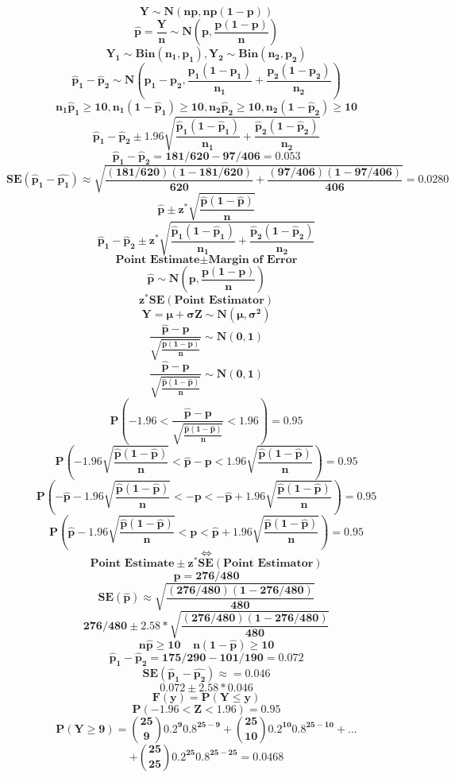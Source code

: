 \documentclass[12pt,portrait,semhelv,semrot]{article}
\begin{document}
{{$$\boldsymbol{Y\sim N(np, np(1-p))}$$
$$\boldsymbol{\hat{p} = \frac{Y}{n} \sim N\left(p, \frac{p(1-p)}{n}\right)}$$
$$\boldsymbol{Y_1\sim Bin(n_1,p_1), Y_2 \sim Bin(n_2, p_2)}$$
$$\boldsymbol{\hat{p}_1-\hat{p}_2 \sim N\left(p_1-p_2, \frac{p_1(1-p_1)}{n_1}+\frac{p_2(1-p_2)}{n_2}\right)}$$
$$\boldsymbol{n_1\hat{p}_1\geq 10, n_1(1-\hat{p}_1)\geq 10, n_2\hat{p}_2\geq 10, n_2(1-\hat{p}_2)\geq 10}$$
$$\boldsymbol{\hat{p}_1-\hat{p}_2 \pm 1.96\sqrt{\frac{\hat{p}_1(1-\hat{p}_1)}{n_1}+\frac{\hat{p}_2(1-\hat{p}_2)}{n_2}}}$$
$$\boldsymbol{\hat{p}_1 - \hat{p}_2 = 181/620 - 97/406 = 0.053}$$
$$\boldsymbol{SE(\hat{p}_1-\hat{p_1}) \approx \sqrt{\frac{(181/620)(1-181/620)}{620}+\frac{(97/406)(1-97/406)}{406}} = 0.0280}$$
$$\boldsymbol{\hat{p}\pm z^{*} \sqrt{\frac{\hat{p}(1-\hat{p})}{n}}}$$
$$\boldsymbol{\hat{p}_1-\hat{p}_2 \pm z^{*}\sqrt{\frac{\hat{p}_1(1-\hat{p}_1)}{n_1}+\frac{\hat{p}_2(1-\hat{p}_2)}{n_2}}}$$
$$\boldsymbol{\mbox{Point Estimate}\pm \mbox{Margin of Error}}$$
$$\boldsymbol{\hat{p}\sim N\left(p, \frac{p(1-p)}{n}\right)}$$
$$\boldsymbol{z^{*}SE(\mbox{Point Estimator})}$$
$$\boldsymbol{Y = \mu + \sigma Z \sim N(\mu, \sigma^2)}$$
$$\boldsymbol{\frac{\hat{p} - p}{\sqrt{\frac{p(1-p)}{n}}} \sim N(0, 1)}$$
$$\boldsymbol{\frac{\hat{p} - p}{\sqrt{\frac{\hat{p}(1-\hat{p})}{n}}} \sim N(0, 1)}$$
$$\boldsymbol{P\left(-1.96 < \frac{\hat{p} - p}{\sqrt{\frac{\hat{p}(1-\hat{p})}{n}}} < 1.96\right) = 0.95}$$
$$\boldsymbol{P\left(-1.96\sqrt{\frac{\hat{p}(1-\hat{p})}{n}} < \hat{p} - p < 1.96\sqrt{\frac{\hat{p}(1-\hat{p})}{n}}\right) = 0.95}$$
$$\boldsymbol{P\left(-\hat{p}-1.96\sqrt{\frac{\hat{p}(1-\hat{p})}{n}} < - p < -\hat{p} + 1.96\sqrt{\frac{\hat{p}(1-\hat{p})}{n}}\right) = 0.95}$$
$$\boldsymbol{P\left(\hat{p}-1.96\sqrt{\frac{\hat{p}(1-\hat{p})}{n}} < p < \hat{p} + 1.96\sqrt{\frac{\hat{p}(1-\hat{p})}{n}}\right) = 0.95}$$
$$\boldsymbol{\iff}$$
$$\boldsymbol{\mbox{Point Estimate} \pm z^{*}SE(\mbox{Point Estimator})}$$
$$\boldsymbol{\hat{p} = 276/480}$$
$$\boldsymbol{SE(\hat{p}) \approx \sqrt{\frac{(276/480)(1-276/480)}{480}}}$$
$$\boldsymbol{276/480\pm 2.58*\sqrt{\frac{(276/480)(1-276/480)}{480}}}$$
$$\boldsymbol{n\hat{p}\geq 10~~~~~n(1-\hat{p})\geq 10}$$
$$\boldsymbol{\hat{p}_1 - \hat{p}_2 = 175/290 - 101/190 = 0.072}$$
$$\boldsymbol{SE(\hat{p}_1-\hat{p_2})\approx = 0.046}$$
$$\boldsymbol{0.072\pm 2.58*0.046}$$
$$\boldsymbol{F(y) = P(Y\leq y)}$$
$$\boldsymbol{P(-1.96 < Z < 1.96) = 0.95}$$
$$\boldsymbol{P(Y\geq 9) =\binom{25}{9}0.2^9 0.8^{25-9} + \binom{25}{10}0.2^{10} 0.8^{25-10} + ... }$$
$$\boldsymbol{+ \binom{25}{25}0.2^{25} 0.8^{25-25}= 0.0468}$$ 
}}
\end{document}
